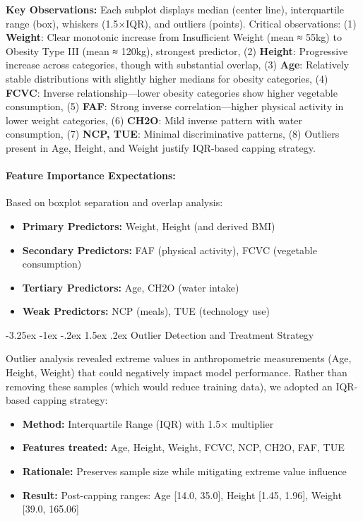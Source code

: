 \documentclass[12pt,a4paper]{article}
\makeatletter
\renewcommand{\subsection}{\@startsection{subsection}{2}{\z@}%
                                   {-3.25ex \@plus -1ex \@minus -.2ex}%
                                   {1.5ex \@plus .2ex}%
                                   {\normalfont\large\bfseries\vspace{0.3\baselineskip}}}
\makeatother
\begin{document}
\noindent\textbf{Key Observations:} Each subplot displays median (center line), interquartile range (box), whiskers (1.5×IQR), and outliers (points). Critical observations: (1) \textbf{Weight}: Clear monotonic increase from Insufficient Weight (mean ≈ 55kg) to Obesity Type III (mean ≈ 120kg), strongest predictor, (2) \textbf{Height}: Progressive increase across categories, though with substantial overlap, (3) \textbf{Age}: Relatively stable distributions with slightly higher medians for obesity categories, (4) \textbf{FCVC}: Inverse relationship—lower obesity categories show higher vegetable consumption, (5) \textbf{FAF}: Strong inverse correlation—higher physical activity in lower weight categories, (6) \textbf{CH2O}: Mild inverse pattern with water consumption, (7) \textbf{NCP, TUE}: Minimal discriminative patterns, (8) Outliers present in Age, Height, and Weight justify IQR-based capping strategy.




\paragraph{Feature Importance Expectations:}
Based on boxplot separation and overlap analysis:
\begin{itemize}
    \item \textbf{Primary Predictors:} Weight, Height (and derived BMI)
    \item \textbf{Secondary Predictors:} FAF (physical activity), FCVC (vegetable consumption)
    \item \textbf{Tertiary Predictors:} Age, CH2O (water intake)
    \item \textbf{Weak Predictors:} NCP (meals), TUE (technology use)
\end{itemize}

\subsection{Outlier Detection and Treatment Strategy}

Outlier analysis revealed extreme values in anthropometric measurements (Age, Height, Weight) that could negatively impact model performance. Rather than removing these samples (which would reduce training data), we adopted an IQR-based capping strategy:

\begin{itemize}
    \item \textbf{Method:} Interquartile Range (IQR) with 1.5× multiplier
    \item \textbf{Features treated:} Age, Height, Weight, FCVC, NCP, CH2O, FAF, TUE
    \item \textbf{Rationale:} Preserves sample size while mitigating extreme value influence
    \item \textbf{Result:} Post-capping ranges: Age [14.0, 35.0], Height [1.45, 1.96], Weight [39.0, 165.06]
\end{itemize}
\end{document}

